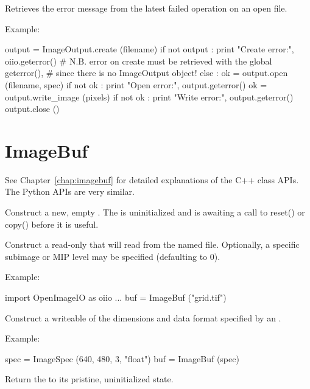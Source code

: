 Retrieves the error message from the latest failed operation on an open
file.

\noindent Example:
\begin{code}
    output = ImageOutput.create (filename)
    if not output :
        print "Create error:", oiio.geterror()
        # N.B. error on create must be retrieved with the global geterror(),
        # since there is no ImageOutput object!
    else :
        ok = output.open (filename, spec)
        if not ok :
            print "Open error:", output.geterror()
        ok = output.write_image (pixels)
        if not ok :
            print "Write error:", output.geterror()
        output.close ()
\end{code}
\apiend



\section{ImageBuf}
\label{sec:pythonimagebuf}

See Chapter~\ref{chap:imagebuf} for detailed explanations of the
C++ \ImageBuf class APIs. The Python APIs are very similar.

Construct a new, empty \ImageBuf. The \ImageBuf is uninitialized and is
awaiting a call to {\cf reset()} or {\cf copy()} before it is useful.
\apiend


Construct a read-only \ImageBuf that will read from the named file.
Optionally, a specific subimage or MIP level may be specified (defaulting to
0).

\noindent Example:
\begin{code}
    import OpenImageIO as oiio
    ...
    buf = ImageBuf ("grid.tif")
\end{code}
\apiend


Construct a writeable \ImageBuf of the dimensions and data format specified
by an \ImageSpec.

\noindent Example:
\begin{code}
    spec = ImageSpec (640, 480, 3, "float")
    buf = ImageBuf (spec)
\end{code}
\apiend

Return the \ImageBuf to its pristine, uninitialized state.

